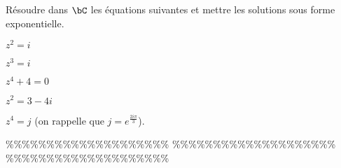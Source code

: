 



\begin{exercice}  \;
R\'esoudre dans $\bC$ les \'equations suivantes et mettre les solutions sous forme exponentielle.
\begin{enumerate}
\begin{minipage}[t]{0.45\textwidth}
\item $z^2=i$
\item $z^3=i$
\item $z^4+4=0$ 
\end{minipage}
\begin{minipage}[t]{0.45\textwidth}
\item $z^2=3-4i$
\item $z^4=j$ (on rappelle que $j=e^{\frac{2i\pi}{3}}$).
\end{minipage}
\end{enumerate}
\end{exercice}


\%\%\%\%\%\%\%\%\%\%\%\%\%\%\%\%\%\%\%\%
\%\%\%\%\%\%\%\%\%\%\%\%\%\%\%\%\%\%\%\%
\%\%\%\%\%\%\%\%\%\%\%\%\%\%\%\%\%\%\%\%




